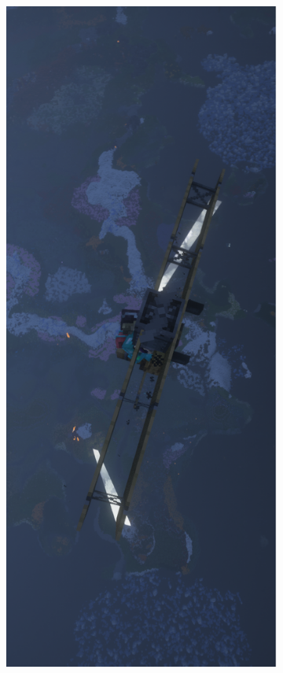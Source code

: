 \begin{figure}
	
	\begin{subfigure}[t]{0.3\linewidth}
		\centering
  	  \includegraphics[width=0.5\linewidth]{Biplane over Mount Bebbo at Night.png}  %
	\end{subfigure} %


\end{figure}
